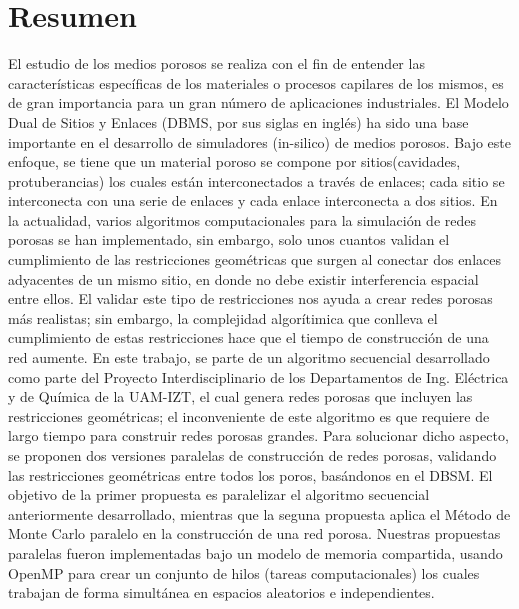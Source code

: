 \chapter{Resumen}
\bigskip
\barra
\bigskip
\thispagestyle{empty}
El estudio de los medios porosos se realiza con el fin de entender las caracter\'isticas espec\'ificas de los materiales o procesos capilares de los mismos, es de gran importancia para un gran n\'umero de aplicaciones industriales. El Modelo Dual de Sitios y Enlaces (DBMS, por sus siglas en ingl\'es) ha sido una base importante en el desarrollo de simuladores (in-silico) de medios porosos. Bajo este enfoque, se tiene que un material poroso se compone por sitios(cavidades, protuberancias) los cuales est\'an interconectados a trav\'es de enlaces; cada sitio se interconecta con una serie de enlaces y cada enlace interconecta a dos sitios. En la actualidad, varios algoritmos computacionales para la simulaci\'on de redes porosas se han implementado, sin embargo, solo unos cuantos validan el cumplimiento de las restricciones geom\'etricas que surgen al conectar dos enlaces adyacentes de un mismo sitio, en donde no debe existir interferencia espacial entre ellos. El validar este tipo de restricciones nos ayuda a crear redes porosas m\'as realistas; sin embargo, la complejidad algor\'itimica que conlleva el cumplimiento de estas restricciones hace que el tiempo de construcci\'on de una red aumente. En este trabajo, se parte de un algoritmo secuencial desarrollado como parte del Proyecto Interdisciplinario de los Departamentos de Ing. El\'ectrica y de Qu\'imica de la UAM-IZT, el cual genera redes porosas que incluyen las restricciones geom\'etricas; el inconveniente de este algoritmo es que requiere de largo tiempo para construir redes porosas grandes. Para solucionar dicho aspecto, se proponen dos versiones paralelas de construcci\'on de redes porosas, validando las restricciones geom\'etricas entre todos los poros, bas\'andonos en el DBSM. El objetivo de la primer propuesta es paralelizar el algoritmo secuencial anteriormente desarrollado, mientras que la seguna propuesta aplica el M\'etodo de Monte Carlo paralelo en la construcci\'on de una red porosa.  Nuestras propuestas paralelas fueron implementadas bajo un modelo de memoria compartida, usando OpenMP para crear un conjunto de hilos (tareas computacionales) los cuales trabajan de forma simult\'anea en espacios aleatorios e independientes.
